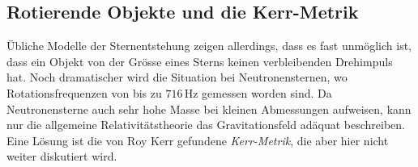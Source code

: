 %
%
\subsection{Rotierende Objekte und die Kerr-Metrik}
Übliche Modelle der Sternentstehung zeigen allerdings, dass es fast
unmöglich ist, dass ein Objekt von der Grösse eines Sterns keinen 
verbleibenden Drehimpuls hat.
Noch dramatischer wird die Situation bei Neutronensternen, wo 
Rotationsfrequenzen von bis zu $716\,\text{Hz}$ gemessen worden sind.
Da Neutronensterne auch sehr hohe Masse bei kleinen Abmessungen
aufweisen, kann nur die allgemeine Relativitätstheorie das Gravitationsfeld
adäquat beschreiben.
Eine Lösung ist die von Roy Kerr gefundene \emph{Kerr-Metrik},
die aber hier nicht weiter diskutiert wird.
%
%


